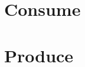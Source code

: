 \documentclass[letterpaper,landscape,twocolumn,8pt]{extarticle}
\begin{document}
\section{Consume}%
\section{Produce}%
\end{document}
